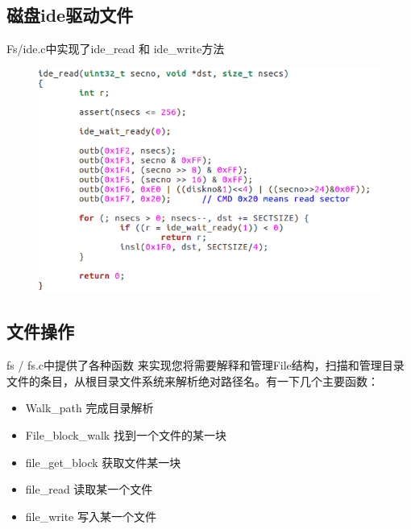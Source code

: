 \documentclass[a4paper,12pt]{report}
\begin{document}
\subsection{	磁盘ide驱动文件}
Fs/ide.c中实现了ide\_read 和 ide\_write方法
\begin{figure}[H]
	\centering
	\includegraphics [width=1.0\textwidth]{figure//image153.png}
\end{figure}



\subsection{	文件操作}

fs / fs.c中提供了各种函数 来实现您将需要解释和管理File结构，扫描和管理目录文件的条目，从根目录文件系统来解析绝对路径名。有一下几个主要函数：
\begin{itemize}
  \item 	Walk\_path 完成目录解析
  \item 	File\_block\_walk 找到一个文件的某一块
  \item 	file\_get\_block 获取文件某一块
  \item 	file\_read 读取某一个文件
  \item 	file\_write 写入某一个文件
\end{itemize}
\end{document}
